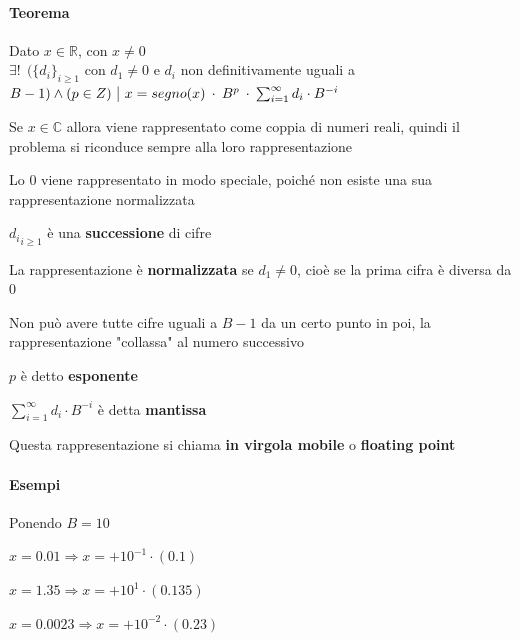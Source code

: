 \documentclass[10pt]{book}
\begin{document}
\paragraph{Teorema} Dato $x \in \mathbb{R}$, con $x \neq 0$\\$\exists!\:\:(\{d_i\}_{i \geq 1}$ con $d_1 \neq 0$ e $d_i$ non definitivamente uguali a $B - 1) \wedge (p \in Z) \:\:\vline\:\: x = segno(x)\:\cdot\:B^p\:\cdot\:\sum_{i=1}^\infty d_i \cdot B^{-i}$
\begin{list}{}{Considerazioni}
	\item Se $x \in \mathbb{C}$ allora viene rappresentato come coppia di numeri reali, quindi il problema si riconduce sempre alla loro rappresentazione
	\item Lo $0$ viene rappresentato in modo speciale, poiché non esiste una sua rappresentazione normalizzata
	\item ${d_i}_{i \geq 1}$ è una \textbf{successione} di cifre
	\item La rappresentazione è \textbf{normalizzata} se $d_1 \neq 0$, cioè se la prima cifra è diversa da 0
	\item Non può avere tutte cifre uguali a $B-1$ da un certo punto in poi, la rappresentazione "collassa" al numero successivo
	\item $p$ è detto \textbf{esponente}
	\item $\sum_{i=1}^\infty d_i \cdot B^{-i}$ è detta \textbf{mantissa}
	\item Questa rappresentazione si chiama \textbf{in virgola mobile} o \textbf{floating point}
\end{list}
\begin{center}
\end{center} %
\pagebreak
\paragraph{Esempi} Ponendo $B = 10$
\begin{list}{}{}
	\item $x = 0.01 \Rightarrow x = +10^{-1}\cdot(0.1)$
	\item $x = 1.35 \Rightarrow x = +10^1\cdot(0.135)$
	\item $x = 0.0023 \Rightarrow x = +10^{-2}\cdot(0.23)$
\end{list}
\end{document}
